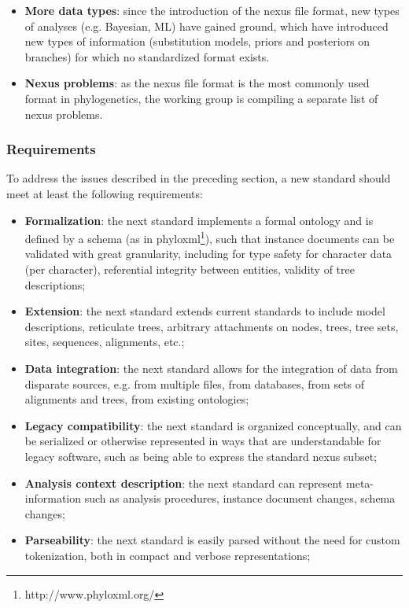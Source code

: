 \documentclass{article}
\begin{document}
\begin{itemize}
\item \textbf{More data types}: since the introduction of the nexus file format, new types of analyses (e.g. Bayesian, ML) have gained 
ground, which have introduced new types of information (substitution models, priors and posteriors on branches) for which no 
standardized format exists.

\item  \textbf{Nexus problems}: as the nexus file format is the most commonly used format in phylogenetics, the working group is compiling 
a separate list of nexus problems.

\end{itemize}

\subsubsection{Requirements}
To address the issues described in the preceding section, a new standard should meet at least the following requirements: 

\begin{itemize}

\item \textbf{Formalization}: the next standard implements a formal ontology and is
defined by a schema (as in phyloxml\footnote{http://www.phyloxml.org/}), such
that instance documents can be validated with great granularity, including for type safety for character data (per character), 
referential integrity between entities, validity of tree descriptions; 

\item \textbf{Extension}: the next standard extends current standards to include model
descriptions, reticulate trees, arbitrary attachments on nodes, trees, tree sets, sites, sequences, alignments, etc.; 

\item \textbf{Data integration}: the next standard allows for the integration of data from disparate sources, e.g. from multiple files, 
from databases, from sets of alignments and trees, from existing ontologies; 

\item \textbf{Legacy compatibility}: the next standard is organized conceptually, and can be serialized or otherwise represented in 
ways that are understandable for legacy software, such as being able to express the standard nexus subset;

\item \textbf{Analysis context description}: the next standard can represent meta-information such as analysis procedures, instance 
document changes, schema changes;

\item \textbf{Parseability}: the next standard is easily parsed without the need for custom tokenization, both in compact and verbose 
representations;

\end{itemize}
\end{document}
